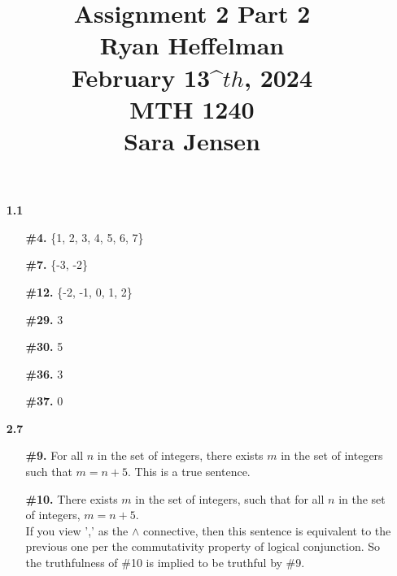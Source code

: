\documentclass[16pt]{article}
\begin{document}
\large
\date{}
\title{\Large Assignment 2 Part 2 \\ Ryan Heffelman \\ February 13^\(th\), 2024 \\ MTH 1240 \\ Sara Jensen}
\maketitle
\begin{enumerate}
    \item[\textbf{1.1}]
    \item[]
    \begin{enumerate}
        \item[\textbf{\#4.}] \{1, 2, 3, 4, 5, 6, 7\}
        \item[\textbf{\#7.}] \{-3, -2\}
        \item[\textbf{\#12.}] \{-2, -1, 0, 1, 2\}
        \item[\textbf{\#29.}] 3
        \item[\textbf{\#30.}] 5
        \item[\textbf{\#36.}] 3
        \item[\textbf{\#37.}] 0
    \end{enumerate}
    \item[\textbf{2.7}]
    \item[]
    \begin{enumerate}
        \item[\textbf{\#9.}] For all $n$ in the set of integers, there exists $m$ in the set of integers such that $m = n + 5$. This is a true sentence.
        \item[\textbf{\#10.}] There exists $m$ in the set of integers, such that for all $n$ in the set of integers, $m = n + 5$. \\
        If you view ',' as the $\land$ connective, then this sentence is equivalent to the previous one per the commutativity property of logical conjunction. So the truthfulness of \#10 is implied to be truthful by \#9.
    \end{enumerate}
\end{enumerate}
\end{document}
